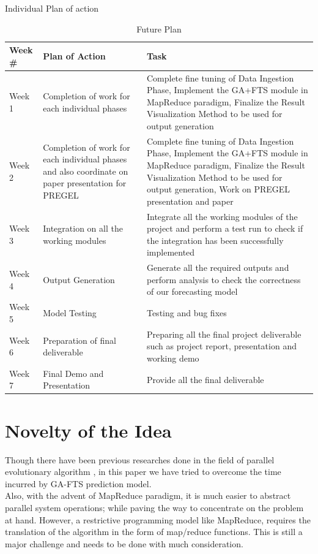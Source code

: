 \documentclass[12pt,journal,compsoc]{IEEEtran}
\begin{document}
\begin{table}[t]
\caption{Individual Plan of action}
\label{indiv_stat}
\end{table}


\begin{table}[t]

\tiny
  
  \centering
  
 
\begin{tabularx}{\textwidth}{ | X | X | X | }
  \hline     
    \rowcolor{lightblue}                            
    \textbf{Week \#} & \textbf{Plan of Action} & \textbf{Task} \\
    \hline     
	Week 1 & Completion of work for each individual phases & Complete fine tuning of Data Ingestion Phase, Implement the GA+FTS module in MapReduce paradigm, Finalize the Result Visualization Method to be used for output generation \\
  \hline     
	Week 2 & Completion of work for each individual phases and also coordinate on paper presentation for PREGEL & Complete fine tuning of Data Ingestion Phase, Implement the GA+FTS module in MapReduce paradigm, Finalize the Result Visualization Method to be used for output generation, Work on PREGEL presentation and paper \\
  \hline     
	Week 3 & Integration on all the working modules & Integrate all the working modules of the project and perform a test run to check if the integration has been successfully implemented \\
  \hline     
	Week 4  & Output Generation & Generate all the required outputs and perform analysis to check the correctness of our forecasting model \\
  \hline     
	Week 5 & Model Testing & Testing and bug fixes \\
  \hline     
	Week 6 & Preparation of final deliverable &  Preparing all the final project deliverable such as project report, presentation and working demo \\
  \hline     
	Week 7 & Final Demo and Presentation &  Provide all the final deliverable \\
	  \hline     
\end{tabularx}

\caption{Future Plan}
\label{future_stat}
\end{table}



\section{Novelty of the Idea}
Though there have been previous researches done in the field of parallel evolutionary algorithm \cite{GA-parallel}, in this paper we have tried to overcome the time incurred by GA-FTS prediction model. 
\\\indent Also, with the advent of MapReduce \cite{mapreduce} paradigm, it is much easier to abstract parallel system operations; while paving the way to concentrate on the problem at hand. However, a restrictive programming model like MapReduce, requires the translation of the algorithm in the form of map/reduce functions. This is still a major challenge and needs to be done with much consideration. 
\end{document}
